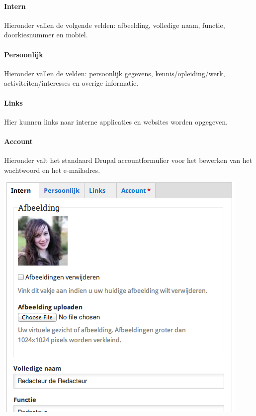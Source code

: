 \paragraph{Intern}

Hieronder vallen de volgende velden: afbeelding, volledige naam, functie, doorkiesnummer en mobiel.

\paragraph{Persoonlijk}

Hieronder vallen de velden: persoonlijk gegevens, kennis/opleiding/werk, activiteiten/interesses en overige informatie.

\paragraph{Links}

Hier kunnen links naar interne applicaties en websites worden opgegeven. 

\paragraph{Account}

Hieronder valt het standaard Drupal accountformulier voor het bewerken van het wachtwoord en het e-mailadres.

\begin{center}
	\includegraphics[scale=0.5]{img/profileedit.png}
\end{center}

